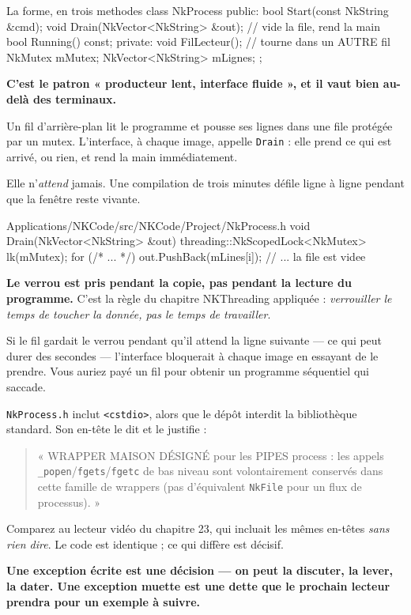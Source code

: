 \begin{nkcode}{La forme, en trois methodes}
class NkProcess {
    public:
        bool Start(const NkString &cmd);
        void Drain(NkVector<NkString> &out);   // vide la file, rend la main
        bool Running() const;
    private:
        void FilLecteur();                     // tourne dans un AUTRE fil
        NkMutex mMutex;
        NkVector<NkString> mLignes;
};
\end{nkcode}

\begin{nkretenir}
\textbf{C'est le patron « producteur lent, interface fluide », et il vaut bien
au-delà des terminaux.}

Un fil d'arrière-plan lit le programme et pousse ses lignes dans une file
protégée par un mutex. L'interface, à chaque image, appelle \texttt{Drain} : elle
prend ce qui est arrivé, ou rien, et rend la main immédiatement.

Elle n'\emph{attend} jamais. Une compilation de trois minutes défile ligne à
ligne pendant que la fenêtre reste vivante.
\end{nkretenir}

\begin{nkcode}{Applications/NKCode/src/NKCode/Project/NkProcess.h}
void Drain(NkVector<NkString> &out) {
    threading::NkScopedLock<NkMutex> lk(mMutex);
    for (/* ... */) { out.PushBack(mLines[i]); }
    // ... la file est videe
}
\end{nkcode}

\begin{nkpiege}
\textbf{Le verrou est pris pendant la copie, pas pendant la lecture du
programme.} C'est la règle du chapitre NKThreading appliquée : \emph{verrouiller
le temps de toucher la donnée, pas le temps de travailler}.

Si le fil gardait le verrou pendant qu'il attend la ligne suivante --- ce qui peut
durer des secondes --- l'interface bloquerait à chaque image en essayant de le
prendre. Vous auriez payé un fil pour obtenir un programme séquentiel qui
saccade.
\end{nkpiege}

\begin{nkretenir}
\texttt{NkProcess.h} inclut \texttt{<cstdio>}, alors que le dépôt interdit la
bibliothèque standard. Son en-tête le dit et le justifie :

\begin{quote}
« WRAPPER MAISON DÉSIGNÉ pour les PIPES process : les appels
\texttt{\_popen}/\texttt{fgets}/\texttt{fgetc} de bas niveau sont volontairement
conservés dans cette famille de wrappers (pas d'équivalent \texttt{NkFile} pour
un flux de processus). »
\end{quote}

Comparez au lecteur vidéo du chapitre 23, qui incluait les mêmes en-têtes
\emph{sans rien dire}. Le code est identique ; ce qui diffère est décisif.

\textbf{Une exception écrite est une décision --- on peut la discuter, la lever,
la dater. Une exception muette est une dette que le prochain lecteur prendra
pour un exemple à suivre.}
\end{nkretenir}

